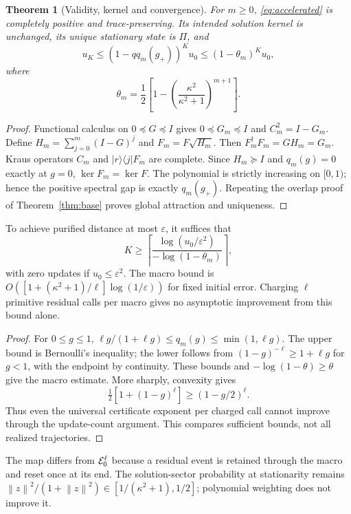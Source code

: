 \documentclass{ieeeaccess}
\newtheorem{theorem}{Theorem}\newtheorem{lemma}{Lemma}
\newcommand{\norm}[1]{\left\lVert #1\right\rVert}
\newcommand{\ket}[1]{\lvert #1\rangle}\newcommand{\bra}[1]{\langle #1\rvert}
\newcommand{\eps}{\varepsilon}\newcommand{\tr}{\mathsf T}
\begin{document}
\begin{theorem}[Validity, kernel and convergence]\label{thm:accelerated}
For $m\ge0$, \eqref{eq:accelerated} is completely positive and trace-preserving. Its intended solution kernel is unchanged, its unique stationary state is $\Pi$, and
\begin{equation}\label{eq:polybound}
u_K\le(1-q q_m(g_+))^K u_0\le(1-\theta_m)^K u_0,
\end{equation}
where
\begin{equation}\label{eq:theta}
\theta_m=\frac12\left[1-\left(\frac{\kappa^2}{\kappa^2+1}\right)^{m+1}\right].
\end{equation}
\end{theorem}
\begin{proof}
Functional calculus on $0\preceq G\preceq I$ gives $0\preceq G_m\preceq I$ and $C_m^2=I-G_m$. Define $H_m=\sum_{j=0}^{m}(I-G)^j$ and $F_m=F\sqrt{H_m}$. Then $F_m^\dagger F_m=GH_m=G_m$. Kraus operators $C_m$ and $\ket r\bra j F_m$ are complete. Since $H_m\succeq I$ and $q_m(g)=0$ exactly at $g=0$, $\ker F_m=\ker F$. The polynomial is strictly increasing on $[0,1)$; hence the positive spectral gap is exactly $q_m(g_+)$. Repeating the overlap proof of Theorem~\ref{thm:base} proves global attraction and uniqueness.
\end{proof}

\begin{corollary}\label{cor:cost}
To achieve purified distance at most $\eps$, it suffices that
\begin{equation}\label{eq:K}
K\ge\left\lceil\frac{\log(u_0/\eps^2)}{-\log(1-\theta_m)}\right\rceil,
\end{equation}
with zero updates if $u_0\le\eps^2$. The macro bound is
$O([1+(\kappa^2+1)/\ell]\log(1/\eps))$ for fixed initial error. Charging $\ell$ primitive residual calls per macro gives no asymptotic improvement from this bound alone.
\end{corollary}
\begin{proof}
For $0\le g\le1$, $\ell g/(1+\ell g)\le q_m(g)\le\min(1,\ell g)$. The upper bound is Bernoulli's inequality; the lower follows from $(1-g)^{-\ell}\ge1+\ell g$ for $g<1$, with the endpoint by continuity. These bounds and $-\log(1-\theta)\ge\theta$ give the macro estimate. More sharply, convexity gives
\begin{equation}\label{eq:charged}
\tfrac12[1+(1-g)^\ell]\ge(1-g/2)^\ell.
\end{equation}
Thus even the universal certificate exponent per charged call cannot improve through the update-count argument. This compares sufficient bounds, not all realized trajectories.
\end{proof}
The map differs from $\mathcal E_0^{\ell}$ because a residual event is retained through the macro and reset once at its end. The solution-sector probability at stationarity remains $\norm z^2/(1+\norm z^2)\in[1/(\kappa^2+1),1/2]$; polynomial weighting does not improve it.
\end{document}
